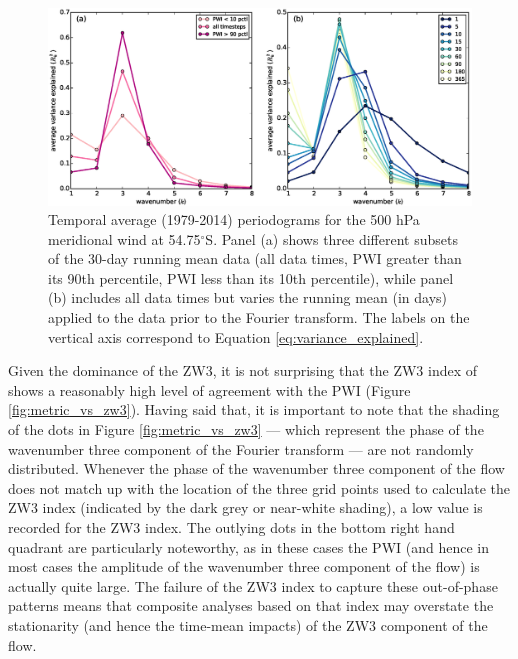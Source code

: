 \begin{figure}
\begin{center}
\includegraphics[width=1\columnwidth]{figures/zonalwaves/va-r2spectrum_ERAInterim_500hPa_daily_native-55S.eps}
\caption{\label{fig:periodograms}
Temporal average (1979-2014) periodograms for the 500 hPa meridional wind at 54.75$^{\circ}$S. Panel (a) shows three different subsets of the 30-day running mean data (all data times, PWI greater than its 90th percentile, PWI less than its 10th percentile), while panel (b) includes all data times but varies the running mean (in days) applied to the data prior to the Fourier transform. The labels on the vertical axis correspond to Equation \ref{eq:variance_explained}.}
\end{center}
\end{figure}


Given the dominance of the ZW3, it is not surprising that the ZW3 index of \citet{Raphael2004} shows a reasonably high level of agreement with the PWI (Figure \ref{fig:metric_vs_zw3}). Having said that, it is important to note that the shading of the dots in Figure \ref{fig:metric_vs_zw3} --- which represent the phase of the wavenumber three component of the Fourier transform --- are not randomly distributed. Whenever the phase of the wavenumber three component of the flow does not match up with the location of the three grid points used to calculate the ZW3 index (indicated by the dark grey or near-white shading), a low value is recorded for the ZW3 index. The outlying dots in the bottom right hand quadrant are particularly noteworthy, as in these cases the PWI (and hence in most cases the amplitude of the wavenumber three component of the flow) is actually quite large. The failure of the ZW3 index to capture these out-of-phase patterns means that composite analyses based on that index may overstate the stationarity (and hence the time-mean impacts) of the ZW3 component of the flow.


